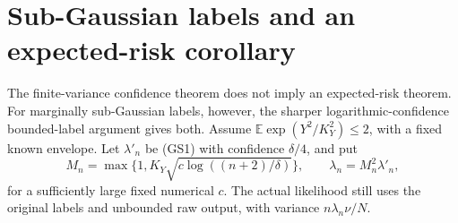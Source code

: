 \section{Sub-Gaussian labels and an expected-risk corollary}
\label{sec:general-shallow-subgaussian-expectation}
The finite-variance confidence theorem does not imply an
expected-risk theorem. For marginally sub-Gaussian labels, however,
the sharper logarithmic-confidence bounded-label argument gives both.
Assume $\mathbb E\exp(Y^2/K_Y^2)\le2$, with a fixed known envelope.
Let $\lambda'_n$ be (GS1) with confidence $\delta/4$, and put
\[
 M_n=\max\{1,K_Y\sqrt{c\log((n+2)/\delta)}\},\qquad
 \lambda_n=M_n^2\lambda'_n,                              \tag{GG1}
\]
for a sufficiently large fixed numerical $c$.
The actual likelihood still uses the original labels and unbounded
raw output, with variance $n\lambda_n\nu/N$.

